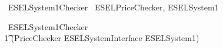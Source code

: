 \begin{zsection}
	\SECTION\ ESELSystem1Checker \parents\ ESELPriceChecker, ESELSystem1
\end{zsection}

\begin{circus}
    \circprocess\ ESELSystem1Checker \circdef \\
        \t1 (PriceChecker \lpar ESELSystemInterface \rpar ESELSystem1) \\
\end{circus}
